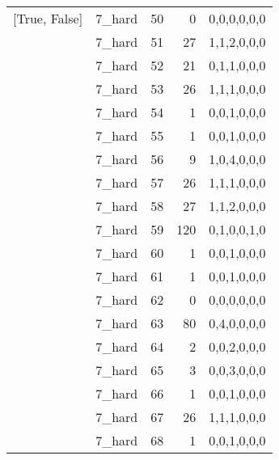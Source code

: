 \begin{tabular}{llrrl}
 [True, False]   & 7\_hard              &            50 &                     0 & 0,0,0,0,0,0   \\
 [True, False]   & 7\_hard              &            51 &                    27 & 1,1,2,0,0,0   \\
 [True, False]   & 7\_hard              &            52 &                    21 & 0,1,1,0,0,0   \\
 [True, False]   & 7\_hard              &            53 &                    26 & 1,1,1,0,0,0   \\
 [True, False]   & 7\_hard              &            54 &                     1 & 0,0,1,0,0,0   \\
 [True, False]   & 7\_hard              &            55 &                     1 & 0,0,1,0,0,0   \\
 [True, False]   & 7\_hard              &            56 &                     9 & 1,0,4,0,0,0   \\
 [True, False]   & 7\_hard              &            57 &                    26 & 1,1,1,0,0,0   \\
 [True, False]   & 7\_hard              &            58 &                    27 & 1,1,2,0,0,0   \\
 [True, False]   & 7\_hard              &            59 &                   120 & 0,1,0,0,1,0   \\
 [True, False]   & 7\_hard              &            60 &                     1 & 0,0,1,0,0,0   \\
 [True, False]   & 7\_hard              &            61 &                     1 & 0,0,1,0,0,0   \\
 [True, False]   & 7\_hard              &            62 &                     0 & 0,0,0,0,0,0   \\
 [True, False]   & 7\_hard              &            63 &                    80 & 0,4,0,0,0,0   \\
 [True, False]   & 7\_hard              &            64 &                     2 & 0,0,2,0,0,0   \\
 [True, False]   & 7\_hard              &            65 &                     3 & 0,0,3,0,0,0   \\
 [True, False]   & 7\_hard              &            66 &                     1 & 0,0,1,0,0,0   \\
 [True, False]   & 7\_hard              &            67 &                    26 & 1,1,1,0,0,0   \\
 [True, False]   & 7\_hard              &            68 &                     1 & 0,0,1,0,0,0   \\

\end{tabular}
